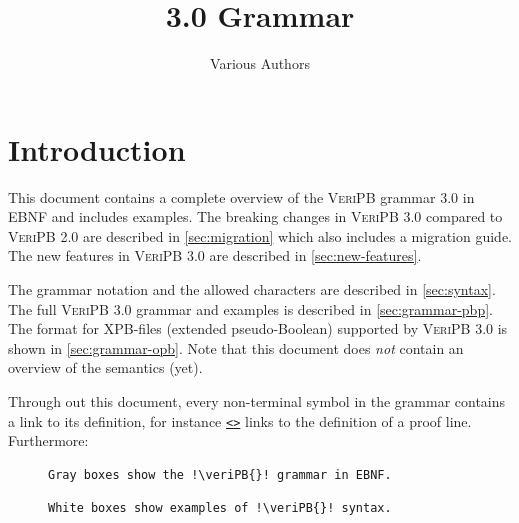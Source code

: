 \documentclass[a4paper]{article}
\title{\veriPB{} 3.0 Grammar}
\author{Various Authors}
\newcommand{\lnkBNF}[1]{\hyperlink{def:#1}{<\detokenize{#1}>}}
\newcommand{\veriPB}[0]{\textsc{VeriPB}}
\begin{document}
\maketitle

\tableofcontents

\section{Introduction}\label{sec:introduction}
This document contains a complete overview of the \veriPB{} grammar 3.0 in EBNF and includes examples. The breaking changes in \veriPB{} 3.0 compared to \veriPB{} 2.0 are described in \autoref{sec:migration} which also includes a migration guide. The new features in \veriPB{} 3.0 are described in \autoref{sec:new-features}.

The grammar notation and the allowed characters are described in \autoref{sec:syntax}. The full \veriPB{} 3.0 grammar and examples is described in \autoref{sec:grammar-pbp}. The format for XPB-files (extended pseudo-Boolean) supported by \veriPB{} 3.0 is shown in \autoref{sec:grammar-opb}. Note that this document does \emph{not} contain an overview of the semantics (yet).

Through out this document, every non-terminal symbol in the grammar contains a link to its definition, for instance \texttt{\lnkBNF{proof_line}} links to the definition of a proof line. Furthermore:
\begin{figure}[H]
	\begin{minipage}{.49\linewidth}
		\begin{lstlisting}[gobble=8]
		Gray boxes show the !\veriPB{}! grammar in EBNF.
		\end{lstlisting}
	\end{minipage}\hfill%
	\begin{minipage}{.49\linewidth}
		\begin{lstlisting}[backgroundcolor=\color{veripb-background}, gobble=8]
		White boxes show examples of !\veriPB{}! syntax.
		\end{lstlisting}
	\end{minipage}
\end{figure}
\end{document}
